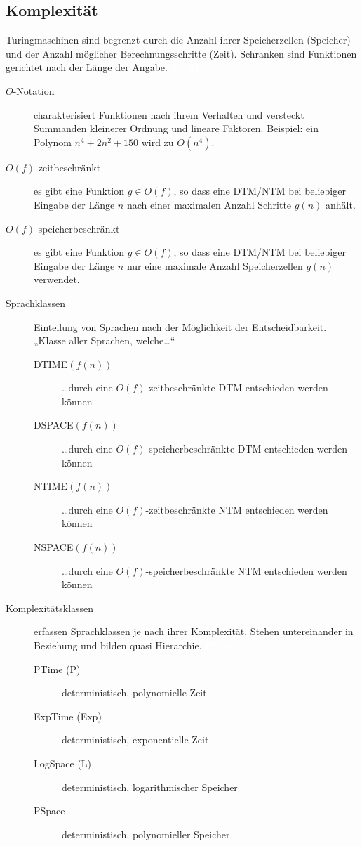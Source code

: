 \documentclass[a4paper,10pt]{article}
\newcommand{\vl}[1]{\colorbox{vl}{\textcolor{white}{\small\textbf{#1}}}}
\begin{document}
    \newpage
    \subsection{Komplexität}
    \label{subsec:fs-komplexitaet}
    Turingmaschinen sind begrenzt durch die Anzahl ihrer Speicherzellen (Speicher) und der Anzahl möglicher Berechnungsschritte (Zeit).
    Schranken sind Funktionen gerichtet nach der Länge der Angabe. \vl{FS 24}

    \begin{description}
        \item[$O$-Notation] charakterisiert Funktionen nach ihrem Verhalten und versteckt Summanden kleinerer Ordnung und lineare Faktoren. Beispiel: ein Polynom $n^{4} + 2n^{2} + 150$ wird zu $O(n^{4})$.
        \item[$O(f)$-zeitbeschränkt] es gibt eine Funktion $g \in O(f)$, so dass eine DTM/NTM bei beliebiger Eingabe der Länge $n$ nach einer maximalen Anzahl Schritte $g(n)$ anhält.
        \item[$O(f)$-speicherbeschränkt] es gibt eine Funktion $g \in O(f)$, so dass eine DTM/NTM bei beliebiger Eingabe der Länge $n$ nur eine maximale Anzahl Speicherzellen $g(n)$ verwendet.

        \item[Sprachklassen] Einteilung von Sprachen nach der Möglichkeit der Entscheidbarkeit. \\
            „Klasse aller Sprachen, welche…“
            \begin{description}
                \item[DTIME$(f(n))$] …durch eine $O(f)$-zeitbeschränkte DTM entschieden werden können
                \item[DSPACE$(f(n))$] …durch eine $O(f)$-speicherbeschränkte DTM entschieden werden können

                \item[NTIME$(f(n))$] …durch eine $O(f)$-zeitbeschränkte NTM entschieden werden können
                \item[NSPACE$(f(n))$] …durch eine $O(f)$-speicherbeschränkte NTM entschieden werden können
            \end{description}

        \item[Komplexitätsklassen] erfassen Sprachklassen je nach ihrer Komplexität.
            Stehen untereinander in Beziehung und bilden quasi Hierarchie. \vl{FS 24}
            \begin{description}
                \item[PTime (P)] deterministisch, polynomielle Zeit
                \item[ExpTime (Exp)] deterministisch, exponentielle Zeit
                \item[LogSpace (L)] deterministisch, logarithmischer Speicher
                \item[PSpace] deterministisch, polynomieller Speicher


\end{description}
\end{description}
\end{document}

